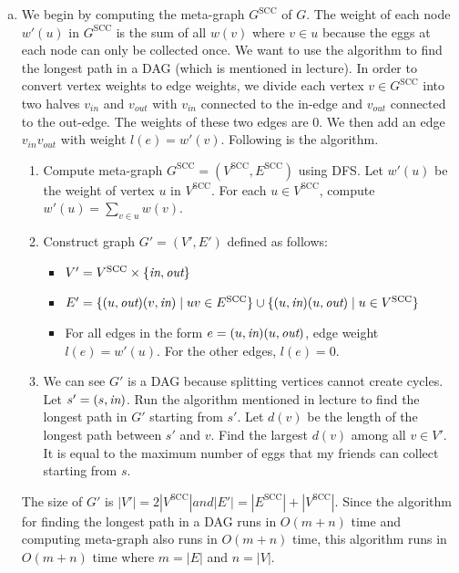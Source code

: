 \documentclass[11pt]{article}
\begin{document}
\begin{solution}
\begin{enumerate}[(a)]
\item We begin by computing the meta-graph $G^{\text{SCC}}$ of $G$. The weight of each node $w'(u)$ in $G^{\text{SCC}}$ is the sum of all $w(v)$ where $v\in u$ because the eggs at each node can only be collected once. We want to use the algorithm to find the longest path in a DAG (which is mentioned in lecture). In order to convert vertex weights to edge weights, we divide each vertex $v\in G^{\text{SCC}}$ into two halves $v_{in}$ and $v_{out}$ with $v_{in}$ connected to the in-edge and $v_{out}$ connected to the out-edge. The weights of these two edges are $0$. We then add an edge $v_{in}v_{out}$ with weight $l(e)=w'(v)$. Following is the algorithm.
\begin{enumerate}[(1)]
\item Compute meta-graph $G^{\text{SCC}}=(V^{\text{SCC}}, E^{\text{SCC}})$ using DFS. Let $w'(u)$ be the weight of vertex $u$ in $V^{\text{SCC}}$. For each $u\in V^{\text{SCC}}$, compute $w'(u)=\sum_{v\in u}{w(v)}$.
\item Construct graph $G'=(V', E')$ defined as follows:
\begin{itemize}
\item $V'= V^{\text{SCC}} \times \{\emph{in}, \emph{out}\}$
\item $E'=\{(u, \emph{out})(v, \emph{in}) \mid uv\in E^{\text{SCC}}\} \cup \{(u, \emph{in})(u, \emph{out}) \mid u\in V^{\text{SCC}}\}$
\item For all edges in the form $e=(u, \emph{in})(u, \emph{out})$, edge weight $l(e)=w'(u)$. For the other edges, $l(e)=0$.
\end{itemize}
\item We can see $G'$ is a DAG because splitting vertices cannot create cycles. Let $s'=(s, \emph{in})$. Run the algorithm mentioned in lecture to find the longest path in $G'$ starting from $s'$. Let $d(v)$ be the length of the longest path between $s'$ and $v$. Find the largest $d(v)$ among all $v\in V'$. It is equal to the maximum number of eggs that my friends can collect starting from $s$.
\end{enumerate}
The size of $G'$ is $|V'|=2|V^{\text{SCC}}| and |E'|=|E^{\text{SCC}}|+|V^{\text{SCC}}|$. Since the algorithm for finding the longest path in a DAG runs in $O(m+n)$ time and computing meta-graph also runs in $O(m+n)$ time, this algorithm runs in $O(m+n)$ time where $m=|E|$ and $n=|V|$.


\end{enumerate}
\end{solution}
\end{document}
